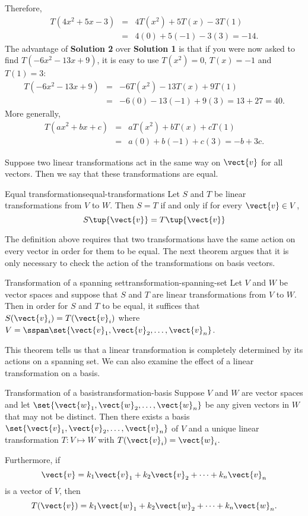 \begin{solution}
Therefore,
\begin{eqnarray*}
T(4x^2+5x-3) & = & 4T(x^2) + 5T(x) -3T(1) \\
& = & 4(0) + 5(-1) - 3(3)=-14.
\end{eqnarray*}
The advantage of \textbf{Solution 2} over \textbf{Solution 1} is that 
if you were now asked to find $T(-6x^2-13x+9)$, it is easy to
use $T(x^2)=0$, $T(x)=-1$ and $T(1)= 3$:
\begin{eqnarray*}
T(-6x^2-13x+9) & = & -6T(x^2)-13T(x)+9T(1) \\
& = & -6(0)-13(-1)+9(3)=13+27=40.
\end{eqnarray*}
More generally, 
\begin{eqnarray*}
T(ax^2+bx+c) & = & aT(x^2)+bT(x)+cT(1) \\
& = & a(0)+b(-1)+c(3)=-b+3c.
\end{eqnarray*}
\end{solution}

Suppose two linear transformations act in the same way on $\vect{v}$ for all vectors. Then we say that these transformations are equal.

\begin{definition}{Equal transformations}{equal-transformations}
Let $S$ and $T$ be linear transformations from $V$ to $W$. Then $S = T$ if and only if for every $\vect{v} \in V$, 
\[
S \tup{\vect{v} } = T \tup{\vect{v} }
\]
\end{definition}

The definition above requires that two transformations have the same action on every vector in order for them to be equal. The next theorem argues that it is only necessary to check the action of the transformations on basis vectors.

\begin{theorem}{Transformation of a spanning set}{transformation-spanning-set}
Let $V$ and $W$ be vector spaces and suppose that $S$ and $T$ are linear transformations from $V$ to $W$. Then in order for $S$ and $T$ to be equal, it suffices that $S(\vect{v}_i) = T(\vect{v}_i)$ where $V=\sspan \set{\vect{v}_1, \vect{v}_2, \ldots, \vect{v}_n}$.
\end{theorem}

This theorem tells us that a linear transformation is completely
determined by its actions on a spanning set. We can also examine the effect of a linear transformation on a basis.

\begin{theorem}{Transformation of a basis}{transformation-basis}
Suppose $V$ and $W$ are vector spaces and let $\set{\vect{w}_1, \vect{w}_2, \ldots, \vect{w}_n}$ be any given vectors in $W$ that may not be distinct. Then there exists a basis $\set{\vect{v}_1, \vect{v}_2, \ldots, \vect{v}_n}$ of $V$ and a unique linear transformation $T: V \mapsto W$ with $T (\vect{v}_i) = \vect{w}_i$.

Furthermore, if 
\[ \vect{v} = k_1\vect{v}_1+k_2\vect{v}_2+ \cdots+ k_n\vect{v}_n\]
is a vector of $V$, then
\[ T(\vect{v}) = k_1\vect{w}_1+k_2\vect{w}_2+ \cdots+ k_n\vect{w}_n.\]
\end{theorem}
